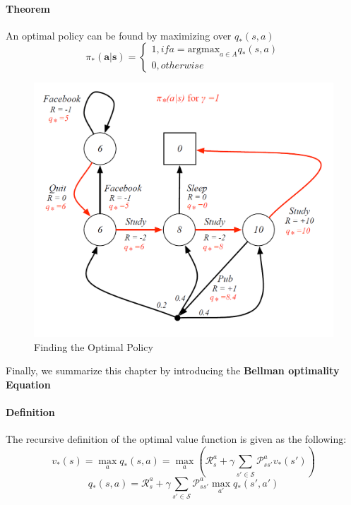	\paragraph{Theorem}
	An optimal policy can be found by maximizing over $q_*(s,a)$ 
	\begin{equation*}
	\pi_*(\mathbf{a|s}) = \begin{cases}
	1, if a = \mathrm{argmax}_{a \in A} q_*(s,a)\\
	0, otherwise
	\end{cases}
	\end{equation*}

	\begin{figure}[h]
	\centering
	\includegraphics[scale=0.5]{ch2fig6.png}
	\caption{Finding the Optimal Policy}
	\end{figure}

	Finally, we summarize this chapter by introducing the \textbf{Bellman optimality Equation}
	\paragraph{Definition} The recursive definition of the optimal value function is given as the following:
	\begin{equation*}
	v_*(s) = \max_a q_*(s,a) = \max_a (\mathcal{R}^a_s + \gamma \sum_{s' \in \mathcal{S}}\mathcal{P}^a_{ss'}v_*(s'))
	\end{equation*}
	\begin{equation*}
	q_*(s,a) = \mathcal{R}^a_s + \gamma \sum_{s' \in \mathcal{S}} \mathcal{P}^a_{ss'} \max_{a'} q_*(s',a')
	\end{equation*}

